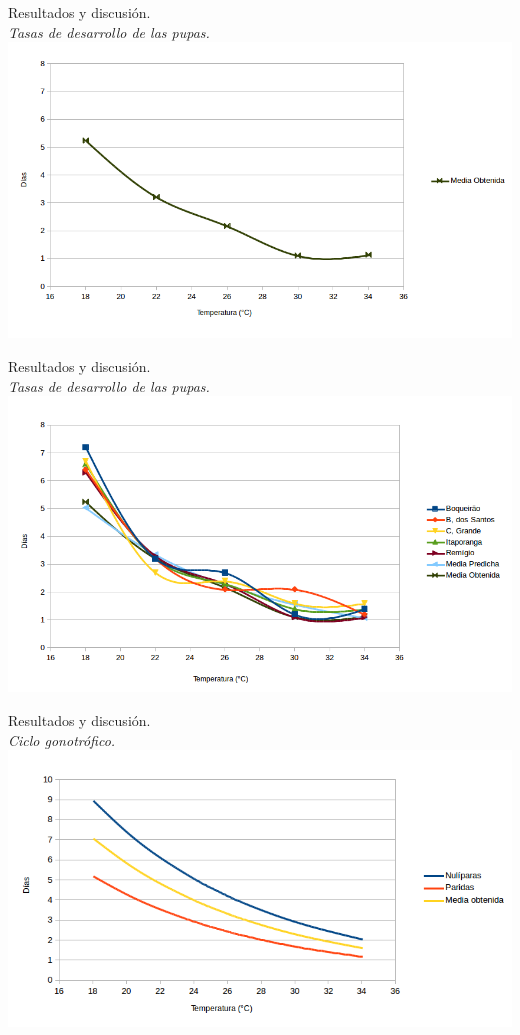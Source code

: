 \begin{frame}[c]{Resultados y discusión.\\\textit{Tasas de desarrollo de las pupas.}}
    \includegraphics[width=\textwidth]{./graphics/pupas-desarrollo-single.png}
\end{frame}

\begin{frame}[c]{Resultados y discusión.\\\textit{Tasas de desarrollo de las pupas.}}
    \includegraphics[width=\textwidth]{./graphics/pupas-desarrollo.png}
\end{frame}

\begin{frame}[t]{Resultados y discusión.\\\textit{Ciclo gonotrófico.}}
    \includegraphics[width=\textwidth]{./graphics/ciclo-gonotrofico-temperatura.png}
\end{frame}


